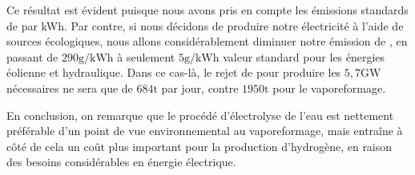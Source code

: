 \documentclass[a4paper, oneside, 12pt]{article}
\begin{document}
Ce résultat est évident puisque nous avons pris en compte 
les émissions standards de  par kWh.
Par contre, si nous décidons de produire notre électricité à l'aide de sources écologiques,
nous allons considérablement diminuer notre émission de , 
en passant de $290\si{\gram/\kilo\watt\hour}$ à seulement $5\si{\gram/\kilo\watt\hour}$ 
valeur standard pour les énergies éolienne et hydraulique. 
Dans ce cas-là, le rejet de  pour produire les $5,7\si{\giga\watt}$ nécessaires 
ne sera que de $684\si{\tonne}$ par jour, 
contre $1950\si{\tonne}$ pour le vaporeformage. 
\newline

En conclusion, on remarque que le procédé d'électrolyse de l'eau 
est nettement préférable d'un point de vue environnemental au vaporeformage, 
mais entraîne à côté de cela un coût plus important pour la production d'hydrogène,
en raison des besoins considérables en énergie électrique.

\end{document}
